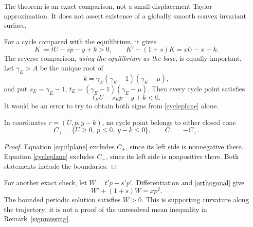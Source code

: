 \documentclass[11pt,a4paper]{article}
\theoremstyle{remark}\newtheorem{remark}[theorem]{Remark}
\begin{document}
The theorem is an exact comparison, not a small-displacement Taylor approximation. It does not assert existence of a globally smooth convex invariant surface.

For a cycle compared with the equilibrium, it gives
\begin{equation}\label{cycleplane}
 K:=tU-sp-y+k>0,\qquad K'+(1+s)K=xU-x+k.
\end{equation}
The reverse comparison, \emph{using the equilibrium as the base}, is equally important. Let $\gamma_E>A$ be the unique root of
\[
 k=\gamma_E(\gamma_E-1)(\gamma_E-\mu),
\]
and put $s_E=\gamma_E-1$, $t_E=(\gamma_E-1)(\gamma_E-\mu)$. Then every cycle point satisfies
\begin{equation}\label{equilplane}
 t_EU-s_Ep-y+k<0.
\end{equation}
It would be an error to try to obtain both signs from \eqref{cycleplane} alone.

\begin{corollary}\label{cones}
In coordinates $r=(U,p,y-k)$, no cycle point belongs to either closed cone
\[
 C_+=\{U\ge0,\ p\le0,\ y-k\le0\},\qquad C_-=-C_+.
\]
\end{corollary}
\begin{proof}
Equation \eqref{equilplane} excludes $C_+$, since its left side is nonnegative there. Equation \eqref{cycleplane} excludes $C_-$, since its left side is nonpositive there. Both statements include the boundaries.
\end{proof}

For another exact check, let $W=t'p-s'p'$. Differentiation and \eqref{orthogonal} give
\[
 W'+(1+s)W=xp^2.
\]
The bounded periodic solution satisfies $W>0$. This is supporting curvature along the trajectory; it is not a proof of the unresolved mean inequality in Remark~\ref{signmissing}.
\end{document}
